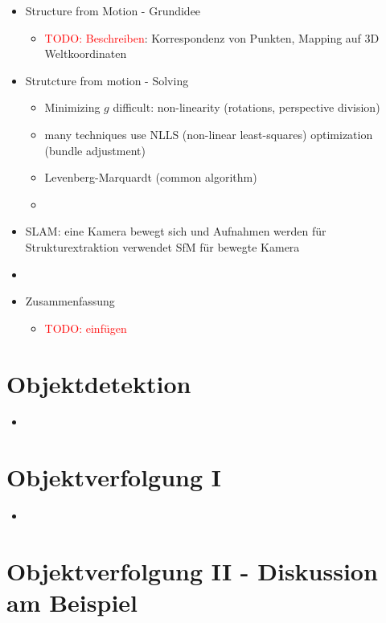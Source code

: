 \documentclass{report}
\newcommand{\todo}[2][red]{\textcolor{#1}{TODO: #2}}
\begin{document}
\begin{itemize}
		\item Structure from Motion - Grundidee
		\begin{itemize}
			\item \todo{Beschreiben}: Korrespondenz von Punkten, Mapping auf 3D Weltkoordinaten
		\end{itemize}
	
		\item Strutcture from motion - Solving
		\begin{itemize}
			\item Minimizing $g$ difficult: non-linearity (rotations, perspective division)
			\item many techniques use NLLS (non-linear least-squares) optimization (bundle adjustment)
			\item Levenberg-Marquardt (common algorithm)
			\item 
		\end{itemize}
	
		\item SLAM: eine Kamera bewegt sich und Aufnahmen werden für Strukturextraktion verwendet
		\newline SfM für bewegte Kamera
		\item 
		\item Zusammenfassung
		\begin{itemize}
			\item \todo{einfügen}
		\end{itemize}
	
	\end{itemize}
	\newpage
	
	\section{Objektdetektion}
	
	\begin{itemize}
		\item 
	\end{itemize}
	
	
	\section{Objektverfolgung I}
	
	\begin{itemize}
		\item 
	\end{itemize}
	
	
	\section{Objektverfolgung II - Diskussion am Beispiel}
	
\end{document}
